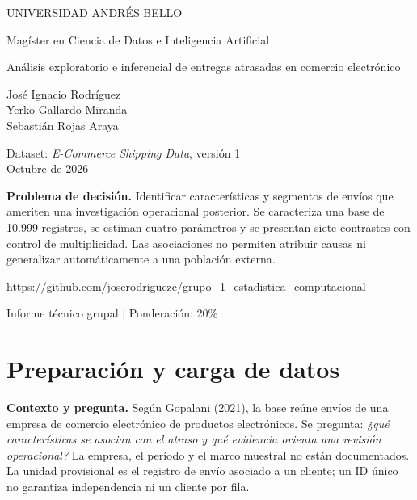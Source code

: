 \documentclass[10pt,a4paper]{article}
\begin{document}
\hypersetup{pageanchor=false}\begin{titlepage}\centering\vspace*{1.4cm}
{\large UNIVERSIDAD ANDRÉS BELLO\par}\vspace{.45cm}
{\Large Magíster en Ciencia de Datos e Inteligencia Artificial\par}
\vspace{1cm}{\large MCDI501 Estadística Computacional para la Toma de Decisiones\par}
\vspace{1.3cm}{\Huge\bfseries Evaluación Sumativa 1\par}\vspace{.6cm}
{\LARGE Análisis exploratorio e inferencial de entregas atrasadas en comercio electrónico\par}
\vspace{1.2cm}{\large Grupo 1\par}\vspace{.25cm}
José Ignacio Rodríguez\\Yerko Gallardo Miranda\\Sebastián Rojas Araya
\vspace{1cm}\par Dataset: \emph{E-Commerce Shipping Data}, versión 1\\Octubre de 2026
\vfill\begin{minipage}{.9\linewidth}\small
\textbf{Problema de decisión.} Identificar características y segmentos de envíos que ameriten una investigación operacional posterior. Se caracteriza una base de 10.999 registros, se estiman cuatro parámetros y se presentan siete contrastes con control de multiplicidad. Las asociaciones no permiten atribuir causas ni generalizar automáticamente a una población externa.
\end{minipage}
\vspace{.7cm}\par\small\url{https://github.com/joserodriguezc/grupo_1_estadistica_computacional}
\vspace{.6cm}\par Informe técnico grupal | Ponderación: 20\%
\end{titlepage}\hypersetup{pageanchor=true}

\section{Preparación y carga de datos}
\textbf{Contexto y pregunta.} Según Gopalani (2021), la base reúne envíos de una empresa de comercio electrónico de productos electrónicos. Se pregunta: \emph{¿qué características se asocian con el atraso y qué evidencia orienta una revisión operacional?} La empresa, el período y el marco muestral no están documentados. La unidad provisional es el registro de envío asociado a un cliente; un ID único no garantiza independencia ni un cliente por fila.
\end{document}

